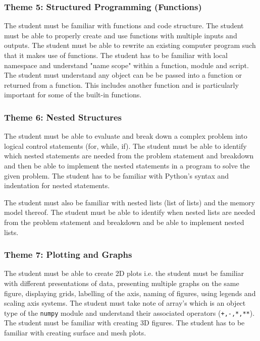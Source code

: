         \subsubsection{Theme 5: Structured Programming (Functions)}
        The student must be familiar with functions and code
        structure.  The student must be able to properly create and
        use functions with multiple inputs and outputs. The student
        must be able to rewrite an existing computer program such that
        it makes use of functions.  The student has to be familiar
        with local namespace and understand "name scope" within a
        function, module and script. The student must understand any
        object can be be passed into a function or returned from a
        function. This includes another function and is particularly
        important for some of the built-in functions.

        \subsubsection{Theme 6: Nested Structures}
            The student must be able to evaluate and break down a complex
            problem into logical control statements (for, while, if). The
            student must be able to identify which nested statements are needed
            from the problem statement and breakdown and then be able to
            implement the nested statements in a program to solve the given
            problem. The student has to be familiar with Python's syntax and
            indentation for nested statements.

            The student must also be familiar with nested lists (list of lists)
            and the memory model thereof. The student must be able to identify
            when nested lists are needed from the problem statement and
            breakdown and be able to implement nested lists.

        \subsubsection{Theme 7: Plotting and Graphs}
        The student must be able to create 2D plots i.e. the student
        must be familiar with different presentations of data,
        presenting multiple graphs on the same figure, displaying
        grids, labelling of the axis, naming of figures, using legends
        and scaling axis systems. The student must take note of
        array's which is an object type of the \texttt{numpy} module
        and understand their associated operators (\texttt{+,-,*,**}).
        The student must be familiar with creating 3D figures. The
        student has to be familiar with creating surface and mesh
        plots.

